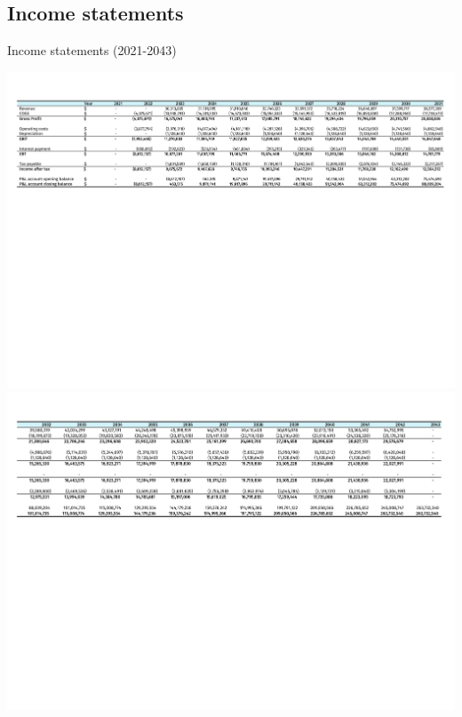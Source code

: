  \begin{landscape}
 

\subsection{Income statements}
\begin{table}
\label{tab:Income}
  \caption{Income statements (2021-2043)}
\includegraphics[clip, trim=0cm 5cm 0cm 1cm, width=\linewidth]{chapters/Z-support/attachments/Income1.pdf}\\

\includegraphics[clip, trim=0cm 5cm 0cm 1cm, width=\linewidth]{chapters/Z-support/attachments/Income2.pdf}
\end{table}

 \end{landscape}



